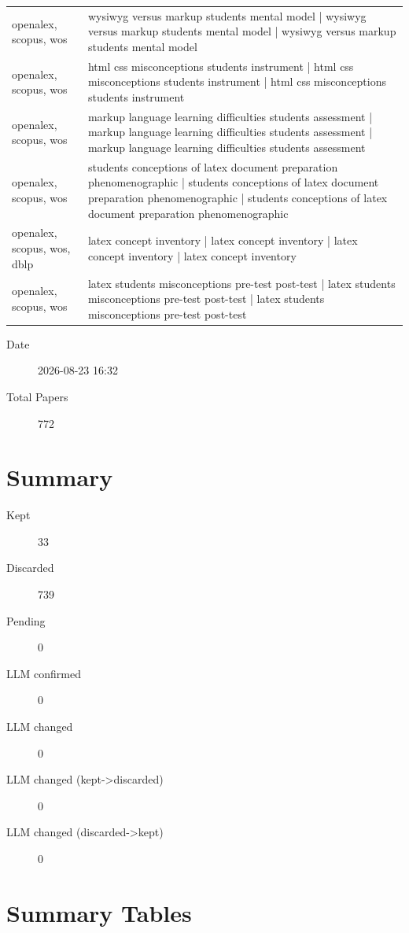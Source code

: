 \documentclass{article}
\begin{document}
\begin{longtable}{lp{10cm}}
openalex, scopus, wos & wysiwyg versus markup students mental model | wysiwyg versus markup students mental model | wysiwyg versus markup students mental model \\
openalex, scopus, wos & html css misconceptions students instrument | html css misconceptions students instrument | html css misconceptions students instrument \\
openalex, scopus, wos & markup language learning difficulties students assessment | markup language learning difficulties students assessment | markup language learning difficulties students assessment \\
openalex, scopus, wos & students conceptions of latex document preparation phenomenographic | students conceptions of latex document preparation phenomenographic | students conceptions of latex document preparation phenomenographic \\
openalex, scopus, wos, dblp & latex concept inventory | latex concept inventory | latex concept inventory | latex concept inventory \\
openalex, scopus, wos & latex students misconceptions pre-test post-test | latex students misconceptions pre-test post-test | latex students misconceptions pre-test post-test \\
\bottomrule
\end{longtable}

\begin{description}
\item[Date] 2026-08-23 16:32
\item[Total Papers] 772
\end{description}

\section{Summary}
\begin{description}
\item[Kept] 33
\item[Discarded] 739
\item[Pending] 0
\item[LLM confirmed] 0
\item[LLM changed] 0
\item[LLM changed (kept->discarded)] 0
\item[LLM changed (discarded->kept)] 0
\end{description}

\section{Summary Tables}
\end{document}
